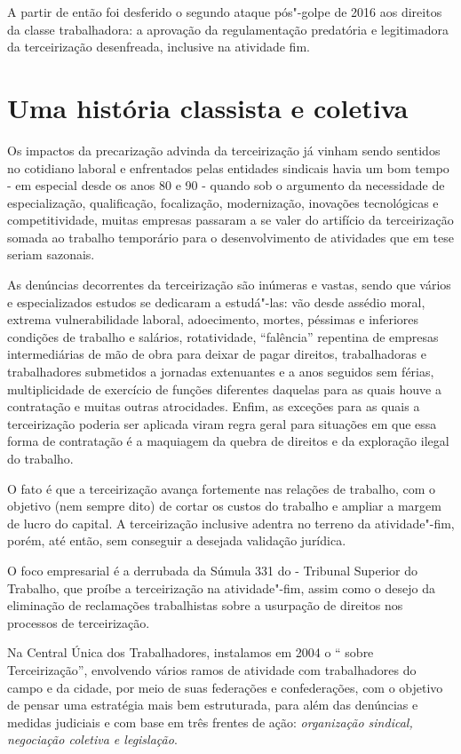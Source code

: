 A partir de então foi desferido o segundo ataque pós"-golpe de 2016 aos
direitos da classe trabalhadora: a aprovação da regulamentação
predatória e legitimadora da terceirização desenfreada, inclusive na
atividade fim.

\section{Uma história classista e coletiva}

Os impactos da precarização advinda da terceirização já vinham sendo
sentidos no cotidiano laboral e enfrentados pelas entidades sindicais
havia um bom tempo - em especial desde os anos 80 e 90 - quando sob o
argumento da necessidade de especialização, qualificação, focalização,
modernização, inovações tecnológicas e competitividade, muitas empresas
passaram a se valer do artifício da terceirização somada ao trabalho
temporário para o desenvolvimento de atividades que em tese seriam
sazonais.

As denúncias decorrentes da terceirização são inúmeras e vastas, sendo
que vários e especializados estudos se dedicaram a estudá"-las: vão desde
assédio moral, extrema vulnerabilidade laboral, adoecimento, mortes,
péssimas e inferiores condições de trabalho e salários, rotatividade,
``falência'' repentina de empresas intermediárias de mão de obra para
deixar de pagar direitos, trabalhadoras e trabalhadores submetidos a
jornadas extenuantes e a anos seguidos sem férias, multiplicidade de
exercício de funções diferentes daquelas para as quais houve a
contratação e muitas outras atrocidades. Enfim, as exceções para as
quais a terceirização poderia ser aplicada viram regra geral para
situações em que essa forma de contratação é a maquiagem da quebra de
direitos e da exploração ilegal do trabalho.

O fato é que a terceirização avança fortemente nas relações de trabalho,
com o objetivo (nem sempre dito) de cortar os custos do trabalho e
ampliar a margem de lucro do capital. A terceirização inclusive adentra
no terreno da atividade"-fim, porém, até então, sem conseguir a desejada
validação jurídica.

O foco empresarial é a derrubada da Súmula 331 do  - Tribunal
Superior do Trabalho, que proíbe a terceirização na atividade"-fim, assim
como o desejo da eliminação de reclamações trabalhistas sobre a
usurpação de direitos nos processos de terceirização.

Na Central Única dos Trabalhadores, instalamos em 2004 o ``
sobre Terceirização'', envolvendo vários ramos de atividade com
trabalhadores do campo e da cidade, por meio de suas federações e
confederações, com o objetivo de pensar uma estratégia mais bem
estruturada, para além das denúncias e medidas judiciais e com base em
três frentes de ação: \emph{organização sindical, negociação coletiva e
legislação}.

